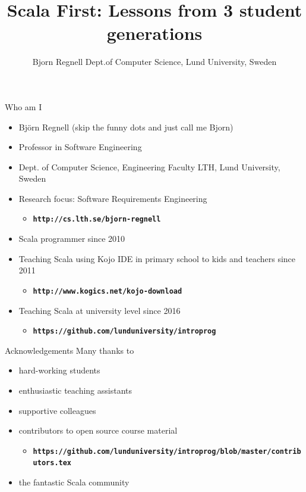 \documentclass[aspectratio=169]{beamer}
\title[Scala First Lessons]{Scala First: \vspace{0.25em}\newline \fontsize{16}{25}\selectfont Lessons from 3 student generations }
\author[cs.lth.se/bjorn-regnell]{%
  Bjorn Regnell\newline
  Dept.\@ of Computer Science, Lund University, Sweden}
\newcommand{\TitleSlide}{\begin{frame}[plain]\titlepage\end{frame}}
\newenvironment{Slide}[1]%
  {\begin{frame}[environment=Slide]{#1}}
  {\end{frame}}%
\begin{document}
\TitleSlide


\begin{Slide}{Who am I}
\begin{itemize}
\item Björn Regnell (skip the funny dots and just call me Bjorn)
\item Professor in Software Engineering
\item Dept. of Computer Science, Engineering Faculty LTH, Lund University, Sweden
\item Research focus: Software Requirements Engineering
\begin{itemize}
  \item \textbf{\texttt{http://cs.lth.se/bjorn-regnell}}  
\end{itemize}  
  
\item Scala programmer since 2010 
\item Teaching Scala using Kojo IDE in primary school to kids and teachers since 2011
\begin{itemize}
  \item \textbf{\texttt{http://www.kogics.net/kojo-download}}  
\end{itemize}  

\item Teaching Scala at university level since 2016
\begin{itemize}
  \item \textbf{\texttt{https://github.com/lunduniversity/introprog}}  
\end{itemize}  

\end{itemize}  


\end{Slide}

\begin{Slide}{Acknowledgements}
  Many thanks to
  \begin{itemize}
    \item hard-working students
    \item enthusiastic teaching assistants
    \item supportive colleagues
    \item contributors to open source course material
    \begin{itemize}
      \item \textbf{\fontsize{8}{12}\selectfont\texttt{https://github.com/lunduniversity/introprog/blob/master/contributors.tex}}      
    \end{itemize}
    \item the fantastic Scala community 
  \end{itemize}
\end{Slide}
\end{document}
